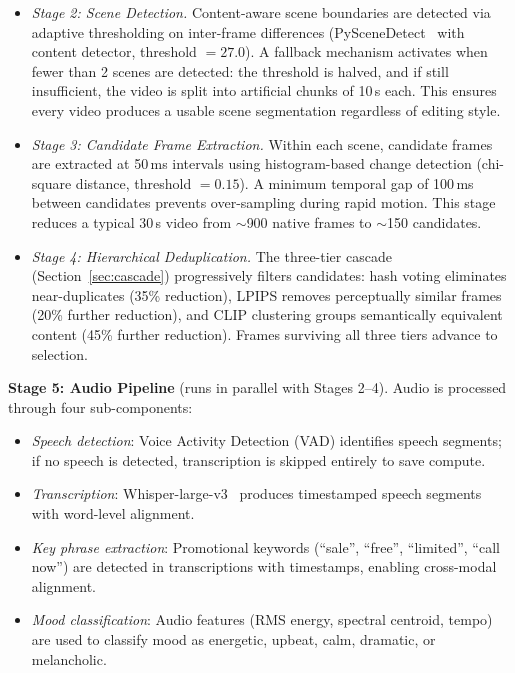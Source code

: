 \documentclass[sigconf,nonacm]{acmart}
\begin{document}
\begin{itemize}
    \item \textit{Stage 2: Scene Detection.} Content-aware scene boundaries are detected via adaptive thresholding on inter-frame differences (PySceneDetect~\cite{cernekova2006entropy} with content detector, threshold $= 27.0$). A fallback mechanism activates when fewer than 2 scenes are detected: the threshold is halved, and if still insufficient, the video is split into artificial chunks of 10\,s each. This ensures every video produces a usable scene segmentation regardless of editing style.

    \item \textit{Stage 3: Candidate Frame Extraction.} Within each scene, candidate frames are extracted at 50\,ms intervals using histogram-based change detection (chi-square distance, threshold $= 0.15$). A minimum temporal gap of 100\,ms between candidates prevents over-sampling during rapid motion. This stage reduces a typical 30\,s video from $\sim$900 native frames to $\sim$150 candidates.

    \item \textit{Stage 4: Hierarchical Deduplication.} The three-tier cascade (Section~\ref{sec:cascade}) progressively filters candidates: hash voting eliminates near-duplicates (35\% reduction), LPIPS removes perceptually similar frames (20\% further reduction), and CLIP clustering groups semantically equivalent content (45\% further reduction). Frames surviving all three tiers advance to selection.
\end{itemize}

\textbf{Stage 5: Audio Pipeline} (runs in parallel with Stages 2--4).
Audio is processed through four sub-components:
\begin{itemize}
    \item \textit{Speech detection}: Voice Activity Detection (VAD) identifies speech segments; if no speech is detected, transcription is skipped entirely to save compute.
    \item \textit{Transcription}: Whisper-large-v3~\cite{radford2022whisper} produces timestamped speech segments with word-level alignment.
    \item \textit{Key phrase extraction}: Promotional keywords (``sale'', ``free'', ``limited'', ``call now'') are detected in transcriptions with timestamps, enabling cross-modal alignment.
    \item \textit{Mood classification}: Audio features (RMS energy, spectral centroid, tempo) are used to classify mood as energetic, upbeat, calm, dramatic, or melancholic.
\end{itemize}
\end{document}
